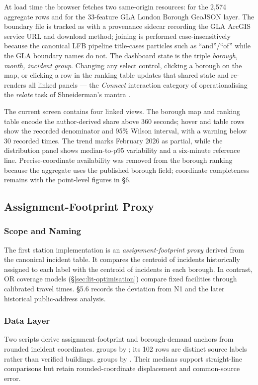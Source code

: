 At load time the browser fetches two same-origin resources:  for the 2{,}574 aggregate rows and  for the 33-feature GLA London Borough GeoJSON layer. The boundary file is tracked as  with a provenance sidecar recording the GLA ArcGIS service URL and download method; joining is performed case-insensitively because the canonical LFB pipeline title-cases particles such as ``and''/``of'' while the GLA boundary names do not. The dashboard state is the triple \emph{borough, month, incident group}. Changing any select control, clicking a borough on the map, or clicking a row in the ranking table updates that shared state and re-renders all linked panels --- the \emph{Connect} interaction category of \cite{yi2007} operationalising the \emph{relate} task of Shneiderman's mantra \cite{shneiderman1996}.

The current screen contains four linked views. The borough map and ranking table encode the author-derived share above 360 seconds; hover and table rows show the recorded denominator and 95\% Wilson interval, with a warning below 30 recorded times. The trend marks February 2026 as partial, while the distribution panel shows median-to-p95 variability and a six-minute reference line. Precise-coordinate availability was removed from the borough ranking because the aggregate uses the published borough field; coordinate completeness remains with the point-level figures in \S6.

\subsection{Assignment-Footprint Proxy}

\subsubsection{Scope and Naming}
The first station implementation is an \emph{assignment-footprint proxy} derived from the canonical incident table. It compares the centroid of incidents historically assigned to each  label with the centroid of incidents in each borough. In contrast, OR coverage models (\S\ref{sec:lit-optimisation}) compare fixed facilities through calibrated travel times. \S5.6 records the deviation from N1 and the later historical public-address analysis.

\subsubsection{Data Layer}
Two scripts derive assignment-footprint and borough-demand anchors from rounded incident coordinates.  groups by ; its 102 rows are distinct source labels rather than verified buildings.  groups by . Their medians support straight-line comparisons but retain rounded-coordinate displacement and common-source error.

